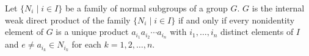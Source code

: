 \begin{theorem}
Let $\{N_i \mid i \in I\}$ be a family of normal subgroups of a group $G$. $G$ is the internal weak direct product of the family $\{N_i \mid i \in I\}$ if and only if every nonidentity element of $G$ is a unique product $a_{i_1}a_{i_2} \cdots a_{i_n}$ with $i_1, \ldots, i_n$ distinct elements of $I$ and $e \neq a_{i_k} \in N_{i_k}$ for each $k = 1, 2, \ldots, n$.
\end{theorem}

